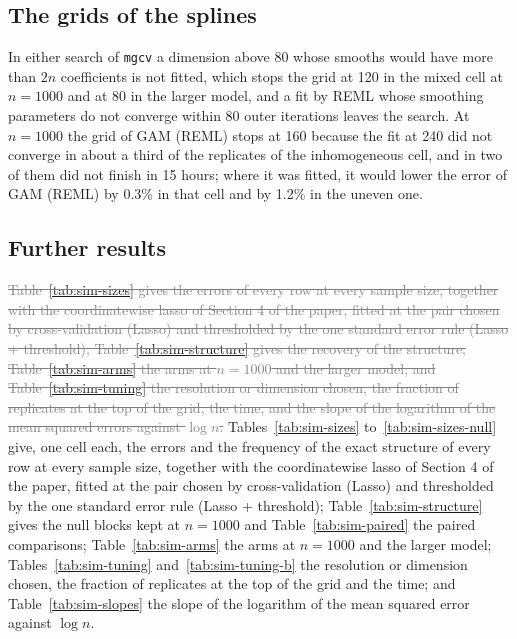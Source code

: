 \documentclass[10pt]{book}
\theoremstyle{definition}
\begin{document}
{\subsection*{The grids of the splines}

In either search of \texttt{mgcv} a dimension above 80 whose smooths would
have more than $2n$ coefficients is not fitted, which stops the grid at 120 in
the mixed cell at $n = 1000$ and at 80 in the larger model, and a fit by REML
whose smoothing parameters do not converge within 80 outer iterations leaves
the search. At $n = 1000$ the grid of GAM (REML) stops at 160 because the fit
at 240 did not converge in about a third of the replicates of the
inhomogeneous cell, and in two of them did not finish in 15 hours; where it
was fitted, it would lower the error of GAM (REML) by 0.3\% in that cell and
by 1.2\% in the uneven one.

\subsection*{Further results}

\textcolor{gray}{\sout{Table~\mbox{\ref{tab:sim-sizes}} gives the errors of every row at every sample size,
together with the coordinatewise lasso of Section 4 of the paper, fitted at
the pair chosen by cross-validation (Lasso) and thresholded by the one
standard error rule (Lasso + threshold); Table~\mbox{\ref{tab:sim-structure}} gives
the recovery of the structure; Table~\mbox{\ref{tab:sim-arms}} the arms at
$n = 1000$ and the larger model; and Table~\mbox{\ref{tab:sim-tuning}} the
resolution or dimension chosen, the fraction of replicates at the top of the
grid, the time, and the slope of the logarithm of the mean squared errors
against $\log n$.}}
Tables~\ref{tab:sim-sizes} to~\ref{tab:sim-sizes-null} give, one cell each,
the errors and the frequency of the exact structure of every row at every
sample size, together with the coordinatewise lasso of Section 4 of the
paper, fitted at the pair chosen by cross-validation (Lasso) and thresholded
by the one standard error rule (Lasso + threshold);
Table~\ref{tab:sim-structure} gives the null blocks kept at $n = 1000$ and
Table~\ref{tab:sim-paired} the paired comparisons; Table~\ref{tab:sim-arms}
the arms at $n = 1000$ and the larger model;
Tables~\ref{tab:sim-tuning} and~\ref{tab:sim-tuning-b} the resolution or
dimension chosen, the fraction of replicates at the top of the grid and the
time; and Table~\ref{tab:sim-slopes} the slope of the logarithm of the mean
squared error against $\log n$.

}
\end{document}
